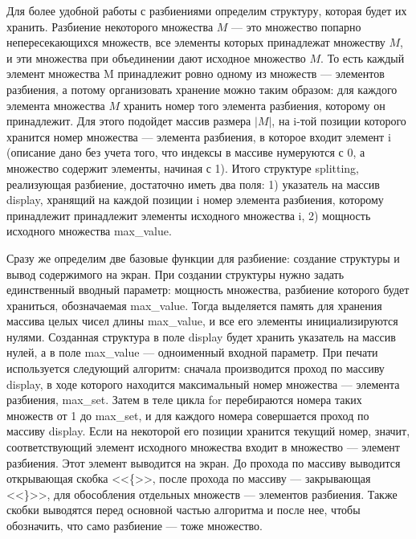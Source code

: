 \documentclass[12pt]{article}
\begin{document}
	Для более удобной работы с разбиениями определим структуру, которая будет их хранить. Разбиение некоторого множества $M$ --- это множество попарно непересекающихся множеств, все элементы которых принадлежат множеству $M$, и эти множества при объединении дают исходное множество $M$. То есть каждый элемент множества M принадлежит ровно одному из множеств --- элементов разбиения, а потому организовать хранение можно таким образом: для каждого элемента множества $M$ хранить номер того элемента разбиения, которому он принадлежит. Для этого подойдет массив размера $|M|$, на i-той позиции которого хранится номер множества --- элемента разбиения, в которое входит элемент i (описание дано без учета того, что индексы в массиве нумеруются с 0, а множество содержит элементы, начиная с 1). Итого структуре splitting, реализующая разбиение, достаточно иметь два поля: 1) указатель на массив display, хранящий на каждой позиции i номер элемента разбиения, которому принадлежит принадлежит элементы исходного множества i, 2) мощность исходного множества max\_value. 
	
	Сразу же определим две базовые функции для разбиение: создание структуры и вывод содержимого на экран. При создании структуры нужно задать единственный вводный параметр: мощность множества, разбиение которого будет храниться, обозначаемая max\_value. Тогда выделяется память для хранения массива целых чисел длины max\_value, и все его элементы инициализируются нулями. Созданная структура в поле display будет хранить указатель на массив нулей, а в поле max\_value --- одноименный входной параметр. При печати используется следующий алгоритм: сначала производится проход по массиву display, в ходе которого находится максимальный номер множества --- элемента разбиения, max\_set. Затем в теле цикла for перебираются номера таких множеств от 1 до max\_set, и для каждого номера совершается проход по массиву display. Если на некоторой его позиции хранится текущий номер, значит, соответствующий элемент исходного множества входит в множество --- элемент разбиения. Этот элемент выводится на экран. До прохода по массиву выводится открывающая скобка <<\{>>, после прохода по массиву --- закрывающая <<\}>>, для обособления отдельных множеств --- элементов разбиения. Также скобки выводятся перед основной частью алгоритма и после нее, чтобы обозначить, что само разбиение --- тоже множество.
	
	 
	
\end{document}
